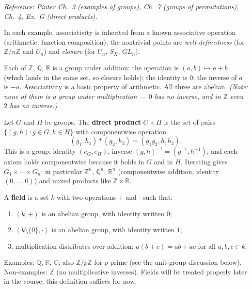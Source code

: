\documentclass[11pt]{report}
\begin{document}
\textit{Reference: Pinter Ch.\ 3 (examples of groups), Ch.\ 7 (groups of permutations), Ch.\ 4, Ex.\ G (direct products).}

In each example, associativity is inherited from a known associative operation (arithmetic, function composition); the nontrivial points are \emph{well-definedness} (for $\mathbb{Z}/n\mathbb{Z}$ and $U_n$) and \emph{closure} (for $U_n$, $S_X$, $GL_n$).

\begin{defbox}\label{def:additive-groups-z-q-r}
Each of $\mathbb{Z}$, $\mathbb{Q}$, $\mathbb{R}$ is a group under addition: the operation is $(a, b) \mapsto a + b$ (which lands in the same set, so closure holds); the identity is $0$; the inverse of $a$ is $-a$. Associativity is a basic property of arithmetic. All three are abelian. \textit{(Note: none of them is a group under multiplication --- $0$ has no inverse, and in $\mathbb{Z}$ even $2$ has no inverse.)}
\end{defbox}

\begin{defbox}\label{def:direct-products}
Let $G$ and $H$ be groups. The \textbf{direct product} $G \times H$ is the set of pairs $\{(g, h) : g \in G, h \in H\}$ with componentwise operation
\[ (g_1, h_1) * (g_2, h_2) = (g_1 g_2, h_1 h_2). \]
This is a group: identity $(e_G, e_H)$, inverse $(g, h)^{-1} = (g^{-1}, h^{-1})$, and each axiom holds componentwise because it holds in $G$ and in $H$. Iterating gives $G_1 \times \cdots \times G_n$; in particular $\mathbb{Z}^n$, $\mathbb{Q}^n$, $\mathbb{R}^n$ (componentwise addition, identity $(0, \ldots, 0)$) and mixed products like $\mathbb{Z} \times \mathbb{R}$.
\end{defbox}

\begin{defbox}\label{def:field-provisional-definition}
A \textbf{field} is a set $k$ with two operations $+$ and $\cdot$ such that:
\begin{enumerate}
    \item $(k, +)$ is an abelian group, with identity written $0$;
    \item $(k \setminus \{0\}, \cdot)$ is an abelian group, with identity written $1$;
    \item multiplication distributes over addition: $a(b + c) = ab + ac$ for all $a, b, c \in k$.
\end{enumerate}
Examples: $\mathbb{Q}$, $\mathbb{R}$, $\mathbb{C}$; also $\mathbb{Z}/p\mathbb{Z}$ for $p$ prime (see the unit-group discussion below). Non-examples: $\mathbb{Z}$ (no multiplicative inverses). Fields will be treated properly later in the course; this definition suffices for now.
\end{defbox}
\end{document}

